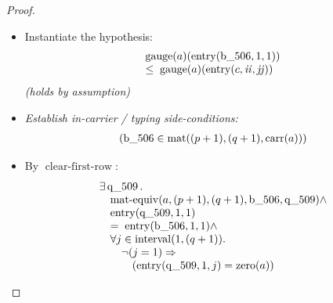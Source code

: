 \documentclass[11pt]{article}
\theoremstyle{plain}
\begin{document}
\begin{proof}
\begin{itemize}[leftmargin=2.8em, itemsep=4pt, parsep=1pt]
  \item[\textbf{29--30}] Instantiate the hypothesis:
\begin{equation*}
\begin{array}{@{}l@{}} \operatorname{gauge}(a)(\operatorname{entry}(\operatorname{b\_506}, 1, 1)) \\ \leq\; \operatorname{gauge}(a)(\operatorname{entry}(c, \mathit{ii}, \mathit{jj})) \end{array}
\end{equation*}
  \emph{(holds by assumption)}
  \item[\textbf{31}] \emph{Establish in-carrier / typing side-conditions:}
\begin{equation*}
\begin{array}{@{}l@{}}
(\operatorname{b\_506} \in \operatorname{mat}((p + 1), (q + 1), \operatorname{carr}(a)))
\end{array}
\end{equation*}

  \item[\textbf{32}] By $\operatorname{clear\text{-}first\text{-}row}$:
\begin{equation*}
\begin{array}{@{}l@{}} \exists \operatorname{q\_509}. \\ \quad \operatorname{mat\text{-}equiv}(a, (p + 1), (q + 1), \operatorname{b\_506}, \operatorname{q\_509}) \wedge \\ \quad \operatorname{entry}(\operatorname{q\_509}, 1, 1) \\ \quad =\; \operatorname{entry}(\operatorname{b\_506}, 1, 1) \wedge \\ \quad \forall j \in \operatorname{interval}(1, (q + 1)). \\ \quad \quad \neg (j = 1) \Rightarrow  \\ \quad \quad \quad (\operatorname{entry}(\operatorname{q\_509}, 1, j) = \operatorname{zero}(a)) \end{array}
\end{equation*}


\end{itemize}
\end{proof}
\end{document}
